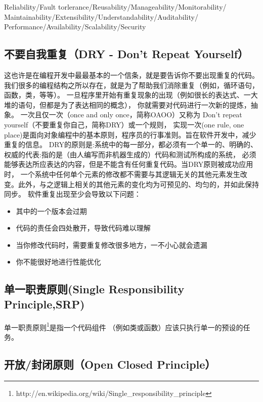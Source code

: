 \documentclass{book}
\begin{document}
Reliability/Fault torlerance/Reusability/Manageability/Monitorability/
Maintainability/Extensibility/Understandability/Auditability/
Performance/Availability/Scalability/Security

\subsection{不要自我重复（DRY - Don’t Repeat Yourself）}

这也许是在编程开发中最最基本的一个信条，就是要告诉你不要出现重复的代码。
我们很多的编程结构之所以存在，就是为了帮助我们消除重复（例如，循环语句，函数，类，等等）。
一旦程序里开始有重复现象的出现（例如很长的表达式、一大堆的语句，但都是为了表达相同的概念），
你就需要对代码进行一次新的提炼，抽象。
一次且仅一次（once and only once，简称OAOO）又称为 Don't repeat yourself（不要重复你自己，简称DRY）或一个规则，
实现一次(one rule, one place)是面向对象编程中的基本原则，程序员的行事准则。旨在软件开发中，减少重复的信息。
DRY的原则是:系统中的每一部分，都必须有一个单一的、明确的、权威的代表:指的是（由人编写而非机器生成的）代码和测试所构成的系统，
必须能够表达所应表达的内容，但是不能含有任何重复代码。当DRY原则被成功应用时，
一个系统中任何单个元素的修改都不需要与其逻辑无关的其他元素发生改变。此外，与之逻辑上相关的其他元素的变化均为可预见的、均匀的，并如此保持同步。
软件重复出现至少会导致以下问题： 

\begin{itemize}
	\item{其中的一个版本会过期}
	\item{代码的责任会四处散开，导致代码难以理解}
	\item{当你修改代码时，需要重复修改很多地方，一不小心就会遗漏}
	\item{你不能很好地进行性能优化}
\end{itemize}

\subsection{单一职责原则(Single Responsibility Principle,SRP)}

单一职责原则\footnote{http://en.wikipedia.org/wiki/Single\_responsibility\_principle}是指一个代码组件
（例如类或函数）应该只执行单一的预设的任务。

\subsection{开放/封闭原则（Open Closed Principle）}
\end{document}
